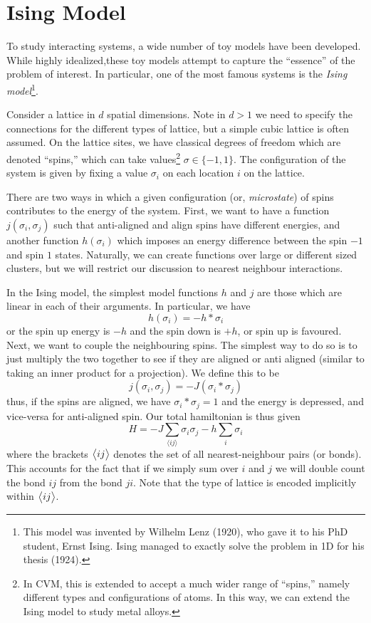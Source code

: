 \section{Ising Model}
To study interacting systems, a wide number of toy models have been developed. While highly idealized,these toy models attempt to capture the ``essence'' of the problem of interest. In particular, one of the most famous systems is the \emph{Ising model}\footnote{This model was invented by Wilhelm Lenz (1920), who gave it to his PhD student, Ernst Ising. Ising managed to exactly solve the problem in 1D for his thesis (1924).}. 

Consider a lattice in \(d\) spatial dimensions. Note in \(d>1\) we need to specify the connections for the different types of lattice, but a simple cubic lattice is often assumed. On the lattice sites, we have classical degrees of freedom which are denoted ``spins,'' which can take values\footnote{In CVM, this is extended to accept a much wider range of ``spins,'' namely different types and configurations of atoms. In this way, we can extend the Ising model to study metal alloys.} \(\sigma\in\{-1,1\}\). The configuration of the system is given by fixing a value \(\sigma_i\) on each location \(i\) on the lattice. 

There are two ways in which a given configuration (or, \emph{microstate}) of spins contributes to the energy of the system. First, we want to have a function \(j(\sigma_i,\sigma_j)\) such that anti-aligned and align spins have different energies, and another function \(h(\sigma_i)\) which imposes an energy difference between the spin \(-1\) and spin \(1\) states. Naturally, we can create functions over large or different sized clusters, but we will restrict our discussion to nearest neighbour interactions.

In the Ising model, the simplest model functions \(h\) and \(j\) are those which are linear in each of their arguments. In particular, we have 
\[h(\sigma_i) = -h*\sigma_i\]
or the spin up energy is \(-h\) and the spin down is \(+h\), or spin up is favoured. Next, we want to couple the neighbouring spins. The simplest way to do so is to just multiply the two together to see if they are aligned or anti aligned (similar to taking an inner product for a projection). We define this to be
\[j(\sigma_i, \sigma_j) = -J(\sigma_i*\sigma_j)\]
thus, if the spins are aligned, we have \(\sigma_i*\sigma_j=1\) and the energy is depressed, and vice-versa for anti-aligned spin. Our total hamiltonian is thus given
\begin{equation}
	H = -J\sum_{\langle ij\rangle}\sigma_i\sigma_j-h\sum_i\sigma_i
\end{equation}
where the brackets \(\left\langle \begin{matrix}ij\end{matrix} \right\rangle\) denotes the set of all nearest-neighbour pairs (or bonds). This accounts for the fact that if we simply sum over \(i\) and \(j\) we will double count the bond \(ij\) from the bond \(ji\). Note that the type of lattice is encoded implicitly within \(\left\langle \begin{matrix}ij\end{matrix} \right\rangle\).


